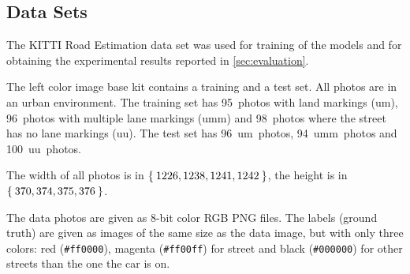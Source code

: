 
\subsection{Data Sets}\label{sec:datasets}
The KITTI Road Estimation data set \cite{Fritsch2013} was used for training of
the models and for obtaining the experimental results reported in
\cref{sec:evaluation}.

The left color image base kit contains a training and a test set. All photos
are in an urban environment. The training set has 95~photos with land markings
(um), 96~photos with multiple lane markings (umm) and 98~photos where the
street has no lane markings (uu). The test set has 96~um~photos, 94~umm~photos
and 100~uu~photos.

The width of all photos is in $\Set{1226, 1238, 1241, 1242}$, the height is in
$\Set{370, 374, 375, 376}$.

The data photos are given as 8-bit color RGB PNG files. The labels (ground
truth) are given as images of the same size as the data image, but with only
three colors: red (\verb+#ff0000+), magenta (\verb+#ff00ff+) for street and
black (\verb+#000000+) for other streets than the one the car is on.